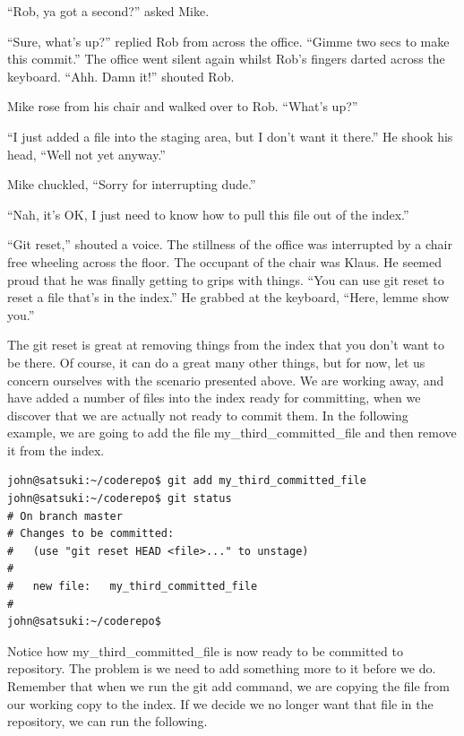 \begin{trenches}
``Rob, ya got a second?'' asked Mike.

``Sure, what's up?'' replied Rob from across the office.  ``Gimme two secs to make this commit.''  The office went silent again whilst Rob's fingers darted across the keyboard.  ``Ahh.  Damn it!'' shouted Rob.  

Mike rose from his chair and walked over to Rob.  ``What's up?''

``I just added a file into the staging area, but I don't want it there.''  He shook his head, ``Well not yet anyway.''

Mike chuckled, ``Sorry for interrupting dude.''

``Nah, it's OK, I just need to know how to pull this file out of the index.''

``Git reset,'' shouted a voice.  The stillness of the office was interrupted by a chair free wheeling across the floor.  The occupant of the chair was Klaus.  He seemed proud that he was finally getting to grips with things.  ``You can use git reset to reset a file that's in the index.''  He grabbed at the keyboard, ``Here, lemme show you.''
\end{trenches}

The git reset is great at removing things from the index that you don't want to be there.  Of course, it can do a great many other things, but for now, let us concern ourselves with the scenario presented above.  We are working away, and have added a number of files into the index ready for committing, when we discover that we are actually not ready to commit them.  In the following example, we are going to add the file my\_third\_committed\_file and then remove it from the index.

\begin{Verbatim}[frame=leftline,framerule=1mm,fontsize=\relsize{-3}] 
john@satsuki:~/coderepo$ git add my_third_committed_file
john@satsuki:~/coderepo$ git status
# On branch master
# Changes to be committed:
#   (use "git reset HEAD <file>..." to unstage)
#
#	new file:   my_third_committed_file
#
john@satsuki:~/coderepo$ 
\end{Verbatim} 

Notice how my\_third\_committed\_file is now ready to be committed to repository.  The problem is we need to add something more to it before we do.  Remember that when we run the git add command, we are copying the file from our working copy to the index.  If we decide we no longer want that file in the repository, we can run the following.  


